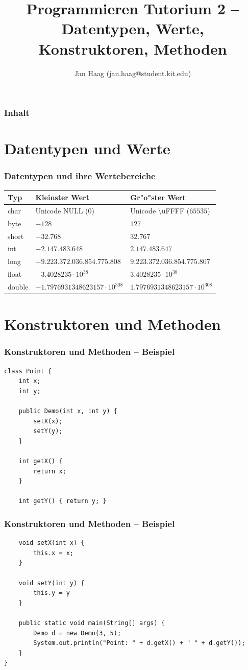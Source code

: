 \documentclass{beamer}
\author{Jan Haag (jan.haag@student.kit.edu)}
\title{Programmieren Tutorium 2 -- Datentypen, Werte, Konstruktoren, Methoden}
\institute{Institut f\"{u}r Zeritfizierbare und Vertrauensw\"{u}rdige Informatiksysteme (ZVI)}
\begin{document}
\begin{frame}
\maketitle
\end{frame}

\begin{frame}
\frametitle{Inhalt}
\tableofcontents
\end{frame}

\section{Datentypen und Werte}
\begin{frame}%
\frametitle{Datentypen und ihre Wertebereiche}
\begin{tabular}{lll}
Typ & Kleinster Wert & Gr"o"ster Wert\\
\hline
char & Unicode NULL ($0$) & Unicode \textbackslash{}uFFFF ($65 535$) \\
byte & $-128$ & $127$ \\
short & $-32.768$ & $32.767$ \\
int & $-2.147.483.648$ & $2.147.483.647$ \\
long & $-9.223.372.036.854.775.808$ & $9.223.372.036.854.775.807$\\
float & $-3.4028235\cdot{}10^{38}$ & $3.4028235\cdot{}10^{38}$\\
double & $-1.7976931348623157\cdot{}10^{308}$ & $1.7976931348623157\cdot{}10^{308}$\\
\end{tabular}
\end{frame}

\section{Konstruktoren und Methoden}
\begin{frame}[fragile]
\frametitle{Konstruktoren und Methoden -- Beispiel}
\begin{verbatim}
class Point {
    int x;
    int y;

    public Demo(int x, int y) {
        setX(x);
        setY(y);
    }

    int getX() {
        return x;
    }

    int getY() { return y; }
\end{verbatim}
\end{frame}

\begin{frame}[fragile]
\frametitle{Konstruktoren und Methoden -- Beispiel}
\begin{verbatim}
    void setX(int x) {
        this.x = x;
    }

    void setY(int y) {
        this.y = y
    }

    public static void main(String[] args) {
        Demo d = new Demo(3, 5);
        System.out.println("Point: " + d.getX() + " " + d.getY());
    }
}
\end{verbatim}
\end{frame}
\end{document}
